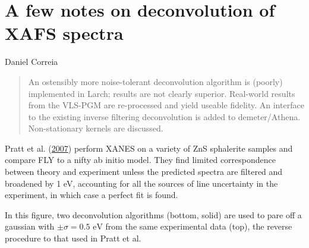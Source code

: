 \documentclass[
]{article}
\author{Daniel Correia}
\date{}
\begin{document}
\hypertarget{a-few-notes-on-deconvolution-of-xafs-spectra}{%
\section{A few notes on deconvolution of XAFS
spectra}\label{a-few-notes-on-deconvolution-of-xafs-spectra}}

\begin{center}
Daniel Correia
\end{center}

\begin{quote}
An ostensibly more noise-tolerant deconvolution algorithm is (poorly)
implemented in Larch; results are not clearly superior. Real-world
results from the VLS-PGM are re-processed and yield useable fidelity. An
interface to the existing inverse filtering deconvolution is added to
demeter/Athena. Non-stationary kernels are discussed.
\end{quote}

\begin{center}
\end{center}

Pratt et al. (\protect\hyperlink{ref-Highresolution2007}{2007}) perform
XANES on a variety of ZnS sphalerite samples and compare FLY to a nifty
ab initio model. They find limited correspondence between theory and
experiment unless the predicted spectra are filtered and broadened by 1
eV, accounting for all the sources of line uncertainty in the
experiment, in which case a perfect fit is found.

In this figure, two deconvolution algorithms (bottom, solid) are used to
pare off a gaussian with \(\pm\sigma=0.5 \text{ eV}\) from the same
experimental data (top), the reverse procedure to that used in Pratt et
al.
\end{document}
